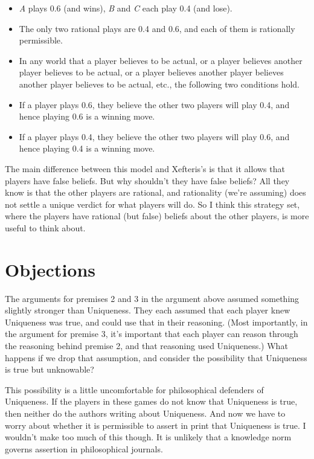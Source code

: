 \documentclass[
  12pt,
  letterpaper,
  DIV=11,
  numbers=noendperiod]{scrreprt}
\providecommand{\tightlist}{%
  \setlength{\itemsep}{0pt}\setlength{\parskip}{0pt}}\usepackage{longtable,booktabs,array}
\begin{document}
\begin{itemize}
\tightlist
\item
  \emph{A} plays 0.6 (and wins), \emph{B} and \emph{C} each play 0.4
  (and lose).
\item
  The only two rational plays are 0.4 and 0.6, and each of them is
  rationally permissible.
\item
  In any world that a player believes to be actual, or a player believes
  another player believes to be actual, or a player believes another
  player believes another player believes to be actual, etc., the
  following two conditions hold.
\item
  If a player plays 0.6, they believe the other two players will play
  0.4, and hence playing 0.6 is a winning move.
\item
  If a player plays 0.4, they believe the other two players will play
  0.6, and hence playing 0.4 is a winning move.
\end{itemize}

The main difference between this model and Xefteris's is that it allows
that players have false beliefs. But why shouldn't they have false
beliefs? All they know is that the other players are rational, and
rationality (we're assuming) does not settle a unique verdict for what
players will do. So I think this strategy set, where the players have
rational (but false) beliefs about the other players, is more useful to
think about.

\hypertarget{objections}{%
\section{Objections}\label{objections}}

The arguments for premises 2 and 3 in the argument above assumed
something slightly stronger than Uniqueness. They each assumed that each
player knew Uniqueness was true, and could use that in their reasoning.
(Most importantly, in the argument for premise 3, it's important that
each player can reason through the reasoning behind premise 2, and that
reasoning used Uniqueness.) What happens if we drop that assumption, and
consider the possibility that Uniqueness is true but unknowable?

This possibility is a little uncomfortable for philosophical defenders
of Uniqueness. If the players in these games do not know that Uniqueness
is true, then neither do the authors writing about Uniqueness. And now
we have to worry about whether it is permissible to assert in print that
Uniqueness is true. I wouldn't make too much of this though. It is
unlikely that a knowledge norm governs assertion in philosophical
journals.
\end{document}
